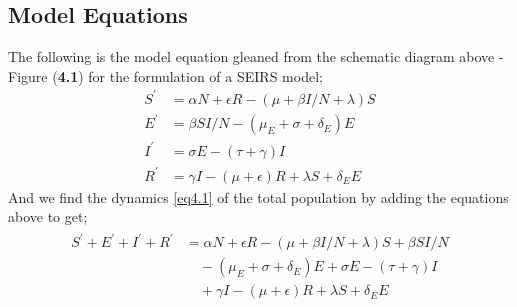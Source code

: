 \subsection{Model Equations}
The following is the model equation gleaned from the schematic diagram above - Figure (\textbf{4.1})  for the formulation of a SEIRS model;
\begin{equation}
\label{eq4.1}
\begin{aligned}
S^{'} &= \alpha N + \epsilon R - \left(\mu + \beta I/N + \lambda\right)S \\
E^{'} &= \beta S I/N -\left(\mu_{E} + \sigma + \delta_{E}\right)E \\
I^{'} &= \sigma E -(\tau + \gamma)I\\
R^{'} &= \gamma I - (\mu + \epsilon)R + \lambda S + \delta_{E}E
\end{aligned}
\end{equation}
And we find the dynamics \ref{eq4.1} of the total population by adding the equations above to get;
\begin{equation}
\begin{split}
\begin{aligned}
S^{'} + E^{'} + I^{'} + R^{'} &= \alpha N + \epsilon R - \left(\mu + \beta I/N + \lambda\right)S + \beta S I/N\\
&\quad-\left(\mu_{E} + \sigma + \delta_{E}\right)E + \sigma E -(\tau + \gamma)I\\
&\quad + \gamma I - (\mu + \epsilon)R + \lambda S + \delta_{E}E
\end{aligned}
\end{split}
\end{equation}



